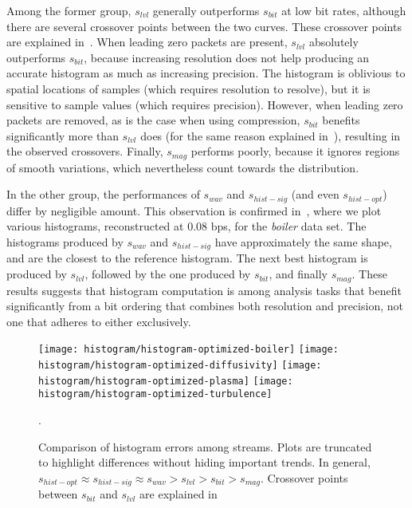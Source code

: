 Among the former group, $s_{lvl}$ generally outperforms $s_{bit}$ at low bit rates, although there
are several crossover points between the two curves. These crossover points are explained
in~. When leading zero packets are present, $s_{lvl}$
absolutely outperforms $s_{bit}$, because increasing resolution does
not help producing an accurate histogram as much as increasing precision. The histogram is oblivious
to spatial locations of samples (which requires resolution to resolve), but it is sensitive to
sample values (which requires precision). However, when leading zero packets are removed, as is the
case when using compression, $s_{bit}$ benefits significantly more than $s_{lvl}$ does (for the same
reason explained in~), resulting in the observed crossovers. Finally,
$s_{mag}$ performs poorly, because it ignores regions of smooth variations, which nevertheless count
towards the distribution.

In the other group, the performances of $s_{wav}$ and $s_{hist-sig}$ (and even $s_{hist-opt}$)
differ by negligible amount. This observation is confirmed in~, where we
plot various histograms, reconstructed at 0.08 bps, for the \emph{boiler} data set. The histograms
produced by $s_{wav}$ and $s_{hist-sig}$ have approximately the same shape, and are the closest to
the reference histogram. The next best histogram is produced by $s_{lvl}$, followed by the one
produced by $s_{bit}$, and finally $s_{mag}$. These results suggests that histogram computation is
among analysis tasks that benefit significantly from a bit ordering that combines both resolution
and precision, not one that adheres to either exclusively.

\begin{figure}[h]
	\centering
	{\texttt{[image: histogram/histogram-optimized-boiler]}}
	{\texttt{[image: histogram/histogram-optimized-diffusivity]}}
	{\texttt{[image: histogram/histogram-optimized-plasma]}}
	{\texttt{[image: histogram/histogram-optimized-turbulence]}}
	\caption{Comparison of histogram errors among streams. Plots are truncated to highlight
	differences without hiding important trends. In general, $s_{hist-opt}\approx s_{hist-sig}\approx
	s_{wav} > s_{lvl} > s_{bit} > s_{mag}$. Crossover points between $s_{bit}$ and $s_{lvl}$ are
	explained in~}.
	\label{fig:histogram-stream-comparison}
\end{figure}

